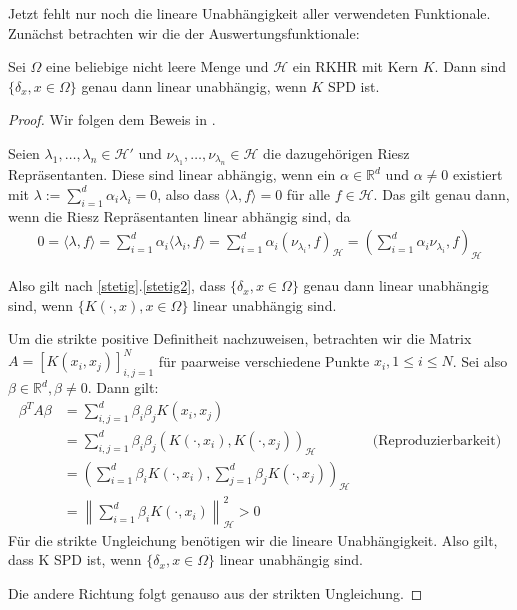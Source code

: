 Jetzt fehlt nur noch die lineare Unabhängigkeit aller verwendeten Funktionale. Zunächst betrachten wir die der Auswertungsfunktionale:
\begin{theorem}
Sei $\Omega$ eine beliebige nicht leere Menge und $\mathcal{H}$ ein \ac{RKHR} mit Kern $K$. Dann sind $\{\delta_x,x\in \Omega\}$ genau dann linear unabhängig, wenn $K$ \ac{SPD} ist.
\end{theorem}

\begin{proof}
Wir folgen dem Beweis in \textcite[Proposition 3.8]{Santin.2017}.

Seien $\lambda_1, \dots, \lambda_n \in \mathcal{H}'$ und $\nu_{\lambda_1},\dots, \nu_{\lambda_n} \in \mathcal{H}$ die dazugehörigen Riesz Repräsentanten. Diese sind linear abhängig, wenn ein $\alpha \in \mathbb{R}^d$ und $\alpha \neq 0$ existiert mit $\lambda := \sum_{i=1}^d \alpha_i \lambda_i = 0$, also dass $\langle \lambda,f \rangle = 0$ für alle $f \in \mathcal{H}$. Das gilt genau dann, wenn die Riesz Repräsentanten linear abhängig sind, da
\begin{align*}
0 = \langle \lambda,f \rangle = \sum_{i=1}^d \alpha_i \langle \lambda_i,f \rangle = \sum_{i=1}^d \alpha_i \left( \nu_{\lambda_i},f\right)_\mathcal{H} = \left( \sum_{i=1}^d \alpha_i \nu_{\lambda_i}, f \right)_\mathcal{H}
\end{align*}

Also gilt nach \ref{stetig}.\ref{stetig2}, dass $\{\delta_x,x\in \Omega\}$ genau dann linear unabhängig sind, wenn $\{K(\cdot,x) , x \in \Omega\}$ linear unabhängig sind.

Um die strikte positive Definitheit nachzuweisen, betrachten wir die Matrix $A=[K(x_i, x_j)]_{i,j=1}^N$ für paarweise verschiedene Punkte $x_i, 1 \le i \le N$. Sei also $\beta \in \mathbb{R}^d, \beta \neq 0$. Dann gilt:
\begin{align*}
\beta^T A \beta &= \sum_{i,j=1}^d \beta_i \beta_j K(x_i, x_j)\\
&= \sum_{i,j=1}^d \beta_i  \beta_j \left(K(\cdot, x_i),K(\cdot,x_j)\right)_\mathcal{H} &&\text{(Reproduzierbarkeit)}\\
&= \left( \sum_{i=1}^d \beta_i K(\cdot,x_i),\sum_{j=1}^d \beta_j K(\cdot, x_j) \right)_\mathcal{H}\\
&= \left\| \sum_{i=1}^d \beta_i K(\cdot, x_i) \right\|_\mathcal{H}^2 > 0
\end{align*}
Für die strikte Ungleichung benötigen wir die lineare Unabhängigkeit. Also gilt, dass K \ac{SPD} ist, wenn $\{\delta_x,x\in \Omega\}$ linear unabhängig sind.

Die andere Richtung folgt genauso aus der strikten Ungleichung.
\end{proof}

